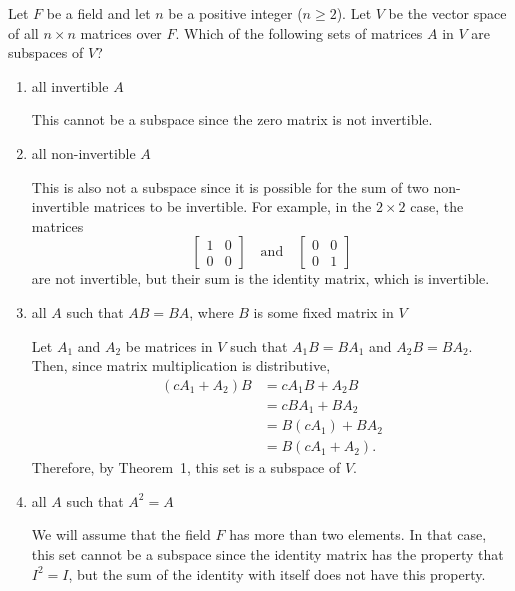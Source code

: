  Let $F$ be a field and let $n$ be a positive integer
($n\geq2$). Let $V$ be the vector space of all $n\times n$ matrices
over $F$. Which of the following sets of matrices $A$ in $V$ are
subspaces of $V$?
\begin{enumerate}
\item all invertible $A$
  \begin{solution}
    This cannot be a subspace since the zero matrix is not invertible.
  \end{solution}
\item all non-invertible $A$
  \begin{solution}
    This is also not a subspace since it is possible for the sum of
    two non-invertible matrices to be invertible. For example, in the
    $2\times2$ case, the matrices
    \begin{equation*}
      \begin{bmatrix}
        1 & 0 \\
        0 & 0
      \end{bmatrix}
      \quad\text{and}\quad
      \begin{bmatrix}
        0 & 0 \\
        0 & 1
      \end{bmatrix}
    \end{equation*}
    are not invertible, but their sum is the identity matrix, which is
    invertible.
  \end{solution}
\item all $A$ such that $AB = BA$, where $B$ is some fixed matrix in
  $V$
  \begin{solution}
    Let $A_1$ and $A_2$ be matrices in $V$ such that $A_1B = BA_1$ and
    $A_2B = BA_2$. Then, since matrix multiplication is distributive,
    \begin{align*}
      (cA_1 + A_2)B &= cA_1B + A_2B \\
                    &= cBA_1 + BA_2 \\
                    &= B(cA_1) + BA_2 \\
                    &= B(cA_1 + A_2).
    \end{align*}
    Therefore, by Theorem~1, this set is a subspace of $V$.
  \end{solution}
\item all $A$ such that $A^2 = A$
  \begin{solution}
    We will assume that the field $F$ has more than two elements. In
    that case, this set cannot be a subspace since the identity matrix
    has the property that $I^2 = I$, but the sum of the identity with
    itself does not have this property.
  \end{solution}
\end{enumerate}


